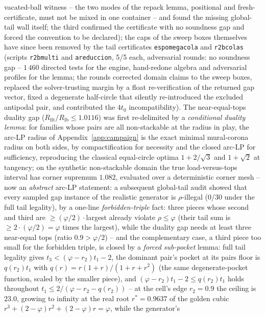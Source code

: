 \documentclass[11pt]{article}
\theoremstyle{definition}
\begin{document}
vacated-ball witness -- the
two modes of the repack lemma, positional and fresh-certificate,
must not be mixed in one container -- and found the missing
global-tail wall itself; the third confirmed the certificate with
no soundness gap and forced the convention to be declared); the caps of the sweep
boxes themselves have since been removed by the tail certificates
\texttt{espomegacola} and \texttt{r2bcolas} (scripts \texttt{r2bmulti} and \texttt{areduccion},
5/5 each, adversarial rounds: no soundness gap -- $1\,460$ directed
tests for the engine, hand-redone algebra and adversarial profiles
for the lemma; the rounds corrected domain claims to the sweep
boxes, replaced the solver-trusting margin by a float
re-verification of the returned gap vector, fixed a degenerate
half-circle that silently re-introduced the excluded antipodal
pair, and contributed the $4t_0$ incompatibility). The near-equal-tops
duality gap ($R_{\mathrm{fit}}/R_{\mathrm{lb}}\le1.0116$) was
first re-delimited by a \emph{conditional duality lemma}: for families whose pairs are all
non-stackable at the radius in play, the arc-LP radius of
Appendix~\ref{app:campaign} is the exact minimal mural-corona radius
on both sides, by compactification for necessity and the closed
arc-LP for sufficiency, reproducing the classical equal-circle
optima $1+2/\sqrt3$ and $1+\sqrt2$ at tangency; on the synthetic
non-stackable domain the true load-versus-tops interval has corner
supremum $1.082$, evaluated over a deterministic corner mesh --
now an \emph{abstract} arc-LP statement: a subsequent global-tail
audit showed that every sampled gap instance of the realistic
generator is $\rho$-illegal ($0/30$ under the full tail
legality), by a one-line \emph{forbidden-triple} fact: three
pieces whose second and third are $\ge(\varphi/2)\cdot$largest
already violate $\rho\le\varphi$ (their tail sum is
$\ge2\cdot(\varphi/2)=\varphi$ times the largest), while the
duality gap needs at least three near-equal tops (ratio
$0.9>\varphi/2$) -- and the complementary case, a third piece too
small for the forbidden triple, is closed by a \emph{forced
sub-pocket} lemma: full tail legality gives
$t_3<(\varphi-r_2)t_1-2$, the dominant pair's pocket at its pairs
floor is $q(r_2)t_1$ with $q(r)=r(1+r)/(1+r+r^2)$ (the same
degenerate-pocket function, scaled by the smaller piece), and
$(\varphi-r_2)t_1-2\le q(r_2)t_1$ holds throughout
$t_1\le2/(\varphi-r_2-q(r_2))$ -- at the cell's edge $r_2=0.9$ the
ceiling is $23.0$, growing to infinity at the real root
$r^{*}=0.9637$ of the golden cubic
$r^3+(2-\varphi)r^2+(2-\varphi)r=\varphi$, while the generator's
\end{document}
